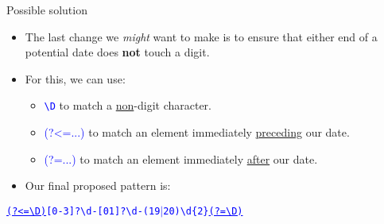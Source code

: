 \documentclass[
	usenames,
	dvipsnames,
	handout
] {beamer}
\newcommand{\reDigit}{\textbackslash{}d}
\newcommand{\reNonDigit}{\textbackslash{}D}
\newcommand{\rePattern}[1]{{\Large\texttt{\textcolor{blue}{#1}}}}
\begin{document}
\begin{frame}{Possible solution}
	\begin{itemize}[label=\textbullet]
		\item The last change we \textit{might} want to make is to ensure that either end of a potential date does \textbf{not} touch a digit.
		      \pause
		\item For this, we can use:
		      \pause
		      \begin{itemize}[label=\textendash]
			      	\item \rePattern{\reNonDigit} to match a \underline{non}-digit character. \\
					\pause
			      	      \medskip			      	      
			      	\item {\Large\textcolor{blue}{(?\textless=...)}} to match an element immediately \underline{preceding} our date. \\
					\pause
			      	      \medskip			      	      
			      	\item {\Large\textcolor{blue}{(?=...)}} to match an element immediately \underline{after} our date. \\
			      		\pause
			      	      \medskip			      	      
		      \end{itemize}
		\item Our final proposed pattern is: \\
		      \bigskip
	\end{itemize}
	
	\rePattern{\underline{(?\textless=\reNonDigit)}[0-3]?\reDigit-[01]?\reDigit-(19$|$20)\reDigit\{2\}\underline{(?=\reNonDigit)}}
\end{frame}
\end{document}

